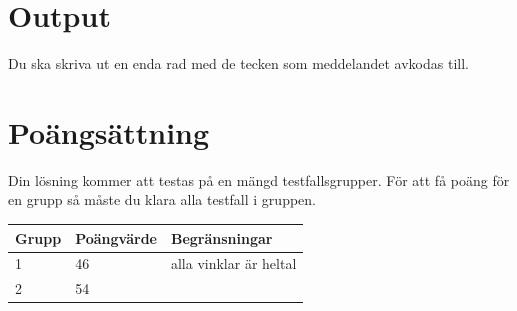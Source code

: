 \section*{Output}
Du ska skriva ut en enda rad med de tecken som meddelandet avkodas till.

\section*{Poängsättning}
Din lösning kommer att testas på en mängd testfallsgrupper. För att få poäng för en grupp så måste du klara alla testfall i gruppen.

\begin{tabular}{| l | l | l |}
	\hline
	Grupp & Poängvärde & Begränsningar\\ \hline
  1     & 46         & alla vinklar är heltal \\ \hline
  2     & 54         & \\ \hline
\end{tabular}

